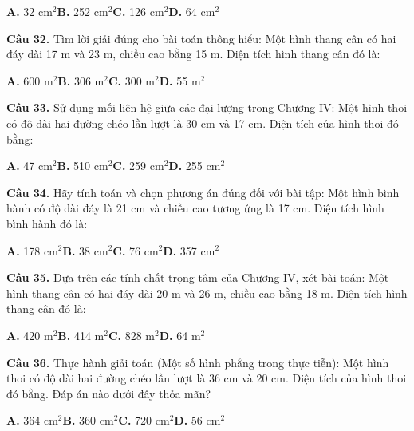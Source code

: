 \documentclass[11pt,a4paper]{article}
\begin{document}
\hspace*{1.5em}\textbf{A.} 32 cm$^2$\quad\quad \textbf{B.} 252 cm$^2$\quad\quad \textbf{C.} 126 cm$^2$\quad\quad \textbf{D.} 64 cm$^2$\par\vspace{2pt}
\textbf{\color{primary} Câu 32.} Tìm lời giải đúng cho bài toán thông hiểu: Một hình thang cân có hai đáy dài 17 m và 23 m, chiều cao bằng 15 m. Diện tích hình thang cân đó là:\par
\hspace*{1.5em}\textbf{A.} 600 m$^2$\quad\quad \textbf{B.} 306 m$^2$\quad\quad \textbf{C.} 300 m$^2$\quad\quad \textbf{D.} 55 m$^2$\par\vspace{2pt}
\textbf{\color{primary} Câu 33.} Sử dụng mối liên hệ giữa các đại lượng trong Chương IV: Một hình thoi có độ dài hai đường chéo lần lượt là 30 cm và 17 cm. Diện tích của hình thoi đó bằng:\par
\hspace*{1.5em}\textbf{A.} 47 cm$^2$\quad\quad \textbf{B.} 510 cm$^2$\quad\quad \textbf{C.} 259 cm$^2$\quad\quad \textbf{D.} 255 cm$^2$\par\vspace{2pt}
\textbf{\color{primary} Câu 34.} Hãy tính toán và chọn phương án đúng đối với bài tập: Một hình bình hành có độ dài đáy là 21 cm và chiều cao tương ứng là 17 cm. Diện tích hình bình hành đó là:\par
\hspace*{1.5em}\textbf{A.} 178 cm$^2$\quad\quad \textbf{B.} 38 cm$^2$\quad\quad \textbf{C.} 76 cm$^2$\quad\quad \textbf{D.} 357 cm$^2$\par\vspace{2pt}
\textbf{\color{primary} Câu 35.} Dựa trên các tính chất trọng tâm của Chương IV, xét bài toán: Một hình thang cân có hai đáy dài 20 m và 26 m, chiều cao bằng 18 m. Diện tích hình thang cân đó là:\par
\hspace*{1.5em}\textbf{A.} 420 m$^2$\quad\quad \textbf{B.} 414 m$^2$\quad\quad \textbf{C.} 828 m$^2$\quad\quad \textbf{D.} 64 m$^2$\par\vspace{2pt}
\textbf{\color{primary} Câu 36.} Thực hành giải toán (Một số hình phẳng trong thực tiễn): Một hình thoi có độ dài hai đường chéo lần lượt là 36 cm và 20 cm. Diện tích của hình thoi đó bằng. Đáp án nào dưới đây thỏa mãn?\par
\hspace*{1.5em}\textbf{A.} 364 cm$^2$\quad\quad \textbf{B.} 360 cm$^2$\quad\quad \textbf{C.} 720 cm$^2$\quad\quad \textbf{D.} 56 cm$^2$\par\vspace{2pt}
\end{document}
